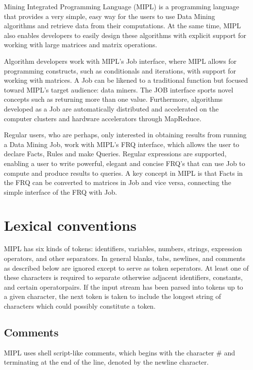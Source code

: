 \documentclass[prodmode,acmtecs]{acmsmall}
\begin{document}
Mining Integrated Programming Language (MIPL) is a programming language
that provides a very simple, easy way for the users to use Data Mining
algorithms and retrieve data from their computations. At the same time, 
MIPL also enables developers to easily design these algorithms with 
explicit support for working with large matrices and matrix operations.

Algorithm developers work with MIPL's Job interface, where MIPL allows
for programming constructs, such as conditionals and iterations, with
support for working with matrices. A Job can be likened to a traditional
function but focused toward MIPL's target audience: data miners. The JOB 
interface sports novel concepts such as returning more than one value.
Furthermore, algorithms developed as a Job are automatically distributed 
and accelerated on the computer clusters and hardware accelerators through
MapReduce. 

Regular users, who are perhaps, only interested in obtaining results from
running a Data Mining Job, work with MIPL's FRQ interface, which allows
the user to declare Facts, Rules and make Queries. Regular expressions are
supported, enabling a user to write powerful, elegant and concise FRQ's 
that can use Job to compute and produce results to queries. A key 
concept in MIPL is that Facts in the FRQ can be converted to matrices
in Job and vice versa, connecting the simple interface of the FRQ with
Job.

\medskip

\section{Lexical conventions}
MIPL has six kinds of tokens: identifiers, variables, numbers, strings,
expression operators, and other separators.  In general blanks, tabs,
newlines, and comments as described below are ignored except to
serve as token seperators. At least one of these characters is required
to separate otherwise adjacent identifiers, constants, and certain
operatorpairs.  If the input stream has been parsed into tokens up
to a given character, the next token is taken to include the longest
string of characters which could possibly constitute a token.
\medskip

\subsection{Comments}

MIPL uses shell script-like comments, which begins with the character
\# and terminating at the end of the line, denoted by the newline character.
\medskip
\end{document}
